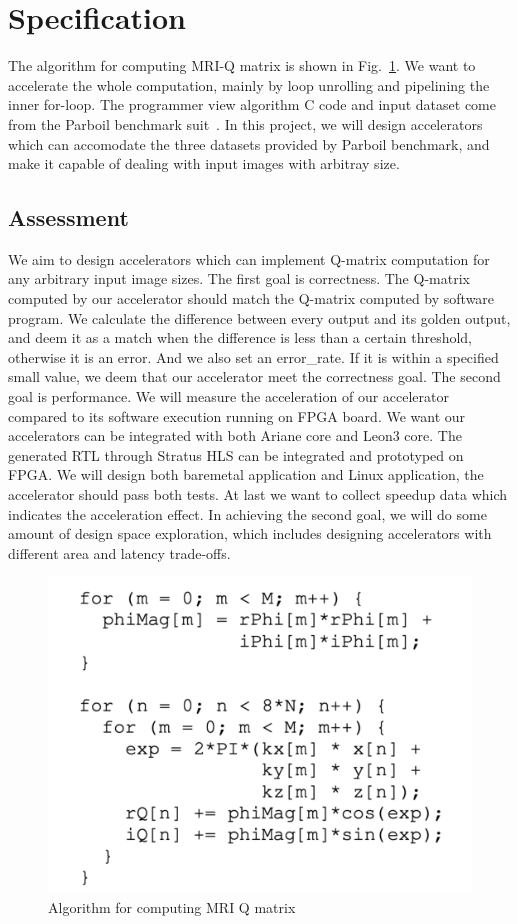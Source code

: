 \section{Specification}
The algorithm for computing MRI-Q matrix is shown in Fig.~\ref{fig-1}. We want to accelerate the whole computation, mainly by loop unrolling and pipelining the inner for-loop. The programmer view algorithm C code and input dataset come from the Parboil benchmark suit~\cite{Rub1}. In this project, we will design accelerators which can accomodate the three datasets provided by Parboil benchmark, and make it capable of dealing with input images with arbitray size.


\subsection{Assessment}
We aim to design accelerators which can implement Q-matrix computation for any arbitrary input image sizes. The first goal is correctness. The Q-matrix computed by our accelerator should match the Q-matrix computed by software program. We calculate the difference between every output and its golden output, and deem it as a match when the difference is less than a certain threshold, otherwise it is an error. And we also set an error\_rate. If it is within a specified small value, we deem that our accelerator meet the correctness goal. The second goal is performance. We will measure the acceleration of our accelerator compared to its software execution running on FPGA board. We want our accelerators can be integrated with both Ariane core and Leon3 core. The generated RTL through Stratus HLS can be integrated and prototyped on FPGA. We will design both baremetal application and Linux application, the accelerator should pass both tests. At last we want to collect speedup data which indicates the acceleration effect. In achieving the second goal, we will do some amount of design space exploration, which includes designing accelerators with different area and latency trade-offs. 
\begin{figure}[t]
\centering
\captionsetup{justification=centering, format=hang}
\includegraphics[width=\columnwidth]{figures/algorithm-proposal}
\caption{Algorithm for computing MRI Q matrix~\cite{stone2008accelerating}}
\label{fig-1}
\end{figure}

